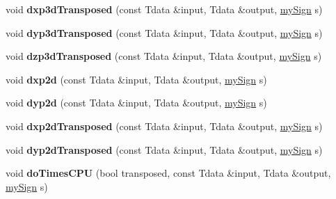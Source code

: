 \begin{DoxyCompactItemize}
void {\bfseries dxp3d\+Transposed} (const Tdata \&input, Tdata \&output, \hyperlink{tools_8h_ab8be8fa992a31c15058261e81ef8ba9d}{my\+Sign} s)
\item 
\mbox{\label{classflex_gradient_operator_a0c5efa1ceda6ee9e0ad626150557fc4b}} 
void {\bfseries dyp3d\+Transposed} (const Tdata \&input, Tdata \&output, \hyperlink{tools_8h_ab8be8fa992a31c15058261e81ef8ba9d}{my\+Sign} s)
\item 
\mbox{\label{classflex_gradient_operator_a1a00cc0370e270af955cac8174d30285}} 
void {\bfseries dzp3d\+Transposed} (const Tdata \&input, Tdata \&output, \hyperlink{tools_8h_ab8be8fa992a31c15058261e81ef8ba9d}{my\+Sign} s)
\item 
\mbox{\label{classflex_gradient_operator_a89682c6d26bb9a8aa7ea1fc57a734009}} 
void {\bfseries dxp2d} (const Tdata \&input, Tdata \&output, \hyperlink{tools_8h_ab8be8fa992a31c15058261e81ef8ba9d}{my\+Sign} s)
\item 
\mbox{\label{classflex_gradient_operator_a3e2d15e37779ce04a9f082dfd127f545}} 
void {\bfseries dyp2d} (const Tdata \&input, Tdata \&output, \hyperlink{tools_8h_ab8be8fa992a31c15058261e81ef8ba9d}{my\+Sign} s)
\item 
\mbox{\label{classflex_gradient_operator_ab2266e66d3afe4d6c3752e145d07444c}} 
void {\bfseries dxp2d\+Transposed} (const Tdata \&input, Tdata \&output, \hyperlink{tools_8h_ab8be8fa992a31c15058261e81ef8ba9d}{my\+Sign} s)
\item 
\mbox{\label{classflex_gradient_operator_a202c728fbd7909e2926d78f35d2dedfc}} 
void {\bfseries dyp2d\+Transposed} (const Tdata \&input, Tdata \&output, \hyperlink{tools_8h_ab8be8fa992a31c15058261e81ef8ba9d}{my\+Sign} s)
\item 
\mbox{\label{classflex_gradient_operator_ae006fcafaae94e9b905fa4dba5296e80}} 
void {\bfseries do\+Times\+C\+PU} (bool transposed, const Tdata \&input, Tdata \&output, \hyperlink{tools_8h_ab8be8fa992a31c15058261e81ef8ba9d}{my\+Sign} s)
\item 
\mbox{\label{classflex_gradient_operator_a45cd508b73224f5339bc467e55876b80}} 

\end{DoxyCompactItemize}
